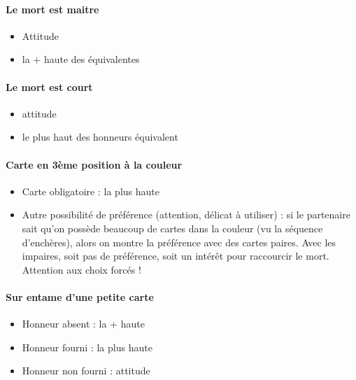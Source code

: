 \documentclass[a4paper]{article}
\begin{document}
\paragraph{Le mort est maitre}

\begin{itemize}
\item Attitude

\item la + haute des équivalentes

\end{itemize}

\paragraph{Le mort est court}

\begin{itemize}
\item attitude

\item le plus haut des honneurs équivalent

\end{itemize}

\paragraph{Carte en 3ème position à la couleur}

\begin{itemize}
\item Carte obligatoire : la plus haute

\item Autre possibilité de préférence (attention, délicat à utiliser) : si le partenaire sait qu’on possède beaucoup de cartes dans la couleur (vu la séquence d’enchères), alors on montre la préférence avec des cartes paires. Avec les impaires, soit pas de préférence, soit un intérêt pour raccourcir le mort. Attention aux choix forcés !

\end{itemize}

\paragraph{Sur entame d’une petite carte}

\begin{itemize}
\item Honneur absent : la + haute

\item Honneur fourni : la plus haute

\item Honneur non fourni : attitude

\end{itemize}
\end{document}
